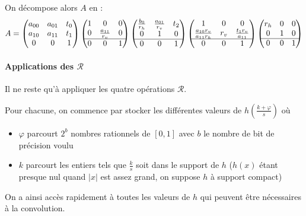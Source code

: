 		On décompose alors $A$ en :
		\[
			A = \begin{pmatrix} a_{00} & a_{01} & t_0\\ a_{10} & a_{11} & t_1\\0&0&1 \end{pmatrix}
			\begin{pmatrix} 1 & 0 & 0\\ 0 & \frac{a_{11}}{r_v} & 0\\ \hline 0 & 0 & 1 \end{pmatrix}
			\begin{pmatrix} \frac{b_{0}}{r_h} & \frac{a_{01}}{r_v} & t_2\\ 0 & 1 & 0\\ \hline 0 & 0 & 1 \end{pmatrix}
			\begin{pmatrix} 1 & 0 & 0\\ \frac{a_{10}r_v}{a_{11}r_h} & r_v & \frac{t_1r_v}{a_{11}}\\ \hline 0 & 0 & 1 \end{pmatrix}
			\begin{pmatrix} r_h & 0 & 0\\ 0 & 1 & 0\\ \hline 0 & 0 & 1 \end{pmatrix}
		\]

	\paragraph{Applications des $\mathcal R$}
		
		Il ne reste qu'à appliquer les quatre opérations $\mathcal R$.
		
		Pour chacune, on commence par stocker les différentes valeurs de $h(\frac{k+\varphi}{s})$ où
		\begin{itemize}
		\item $\varphi$ parcourt $2^b$ nombres rationnels de $[0,1]$ avec $b$ le nombre de bit de précision voulu
		\item $k$ parcourt les entiers tels que $\frac{k}{s}$ soit dans le support de $h$ ($h(x)$ étant presque nul quand $|x|$ est assez grand, on suppose $h$ à support compact)
		\end{itemize}
		On a ainsi accès rapidement à toutes les valeurs de $h$ qui peuvent être nécessaires à la convolution.

